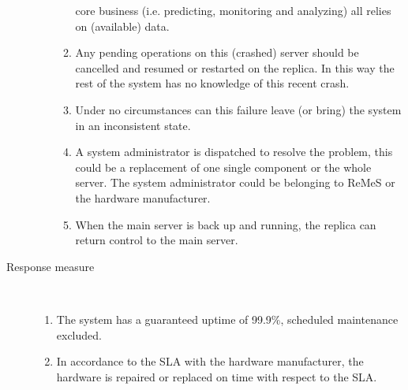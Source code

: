 \begin{description}
\begin{enumerate}
\begin{enumerate}
	   core business (i.e. predicting, monitoring and analyzing) all relies on
	   (available) data.
	   \item Any pending operations on this (crashed) server should be cancelled
	   and resumed or restarted on the replica. In this way the rest of the system
	   has no knowledge of this recent crash.
	   \item Under no circumstances can this failure leave (or bring) the system
	    in an inconsistent state.
	    \item A system administrator is dispatched to resolve the problem, this could be a
	    replacement of one single component or the whole server. The system administrator
	    could be belonging to ReMeS or the hardware manufacturer.
	    \item When the main server is back up and running, the replica can return
	    control to the main server.
	  \end{enumerate}
	\end{enumerate}
	\item[Response measure] \
	\begin{enumerate}
	  \item The system has a guaranteed uptime of 99.9\%, scheduled
	  maintenance excluded.
	  \item In accordance to the SLA with the hardware manufacturer, the hardware
	  is repaired or replaced on time with respect to the SLA.
	\end{enumerate}
\end{description}